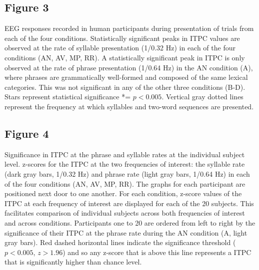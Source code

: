 \documentclass[10pt,letterpaper]{article}
\begin{document}
\subsection*{Figure 3}

EEG responses recorded in human participants during presentation of trials from each of the four conditions. Statistically significant peaks in ITPC values are observed at the rate of syllable presentation (1/0.32 Hz) in each of the four conditions (AN, AV, MP, RR). A statistically significant peak in ITPC is only observed at the rate of phrase presentation (1/0.64 Hz) in the AN condition (A), where phrases are grammatically well-formed and composed of the same  lexical categories. This was not significant in any of the other three conditions (B-D). Stars represent statistical significance *= $p<0.005$. Vertical gray dotted lines represent the frequency at which syllables and two-word sequences are presented.

\subsection*{Figure 4}

Significance in ITPC at the phrase and syllable rates at the individual subject level. z-scores for the ITPC at the two frequencies of interest: the syllable rate (dark gray bars, 1/0.32 Hz) and phrase rate (light gray bars, 1/0.64 Hz) in each of the four conditions (AN, AV, MP, RR). The graphs for each participant are positioned next door to one another. For each condition, z-score values of the ITPC at each frequency of interest are displayed for each of the 20 subjects. This facilitates comparison of individual subjects across both frequencies of interest and across conditions. Participants one to 20 are ordered from left to right by the significance of their ITPC at the phrase rate during the AN condition (A, light gray bars). Red dashed horizontal lines indicate the significance threshold ($p<0.005$, $z>1.96$) and so any z-score that is above this line represents a  ITPC that is significantly higher than chance level.
\end{document}
